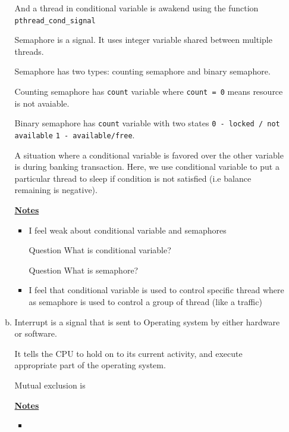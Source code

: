 \documentclass[12pt]{article}
\begin{document}
\begin{enumerate}[1.]
\begin{enumerate}[a)]
        \bigskip

        And a thread in conditional variable is awakend using the function \texttt{pthread\_cond\_signal}

        \bigskip

        Semaphore is a signal. It uses integer variable shared between multiple threads.

        \bigskip

        Semaphore has two types: counting semaphore and binary semaphore.

        \bigskip

        Counting semaphore has \texttt{count} variable where \texttt{count = 0} means
        resource is not avaiable.

        \bigskip

        Binary semaphore has \texttt{count} variable with two states \texttt{0 - locked / not available}
        \texttt{1 - available/free}.

        \bigskip

        A situation where a conditional variable is favored over the other variable
        is during banking transaction. Here, we use conditional variable to put a particular thread
        to sleep if condition is not satisfied (i.e balance remaining is negative).

        \bigskip

        \underline{\textbf{Notes}}

        \begin{itemize}
            \item I feel weak about conditional variable and semaphores
            \item [\color{blue}Question\color{black}] What is conditional variable?
            \item [\color{blue}Question\color{black}] What is semaphore?
            \item I feel that conditional variable is used to control specific thread
            where as semaphore is used to control a group of thread (like a traffic)
        \end{itemize}

        \item

        Interrupt is a signal that is sent to Operating system by either hardware or software.

        \bigskip

        It tells the CPU to hold on to its current activity, and execute appropriate part of the
        operating system.

        \bigskip

        Mutual exclusion is

        \bigskip

        \underline{\textbf{Notes}}

        \begin{itemize}
            \item
        \end{itemize}

    \end{enumerate}


\end{enumerate}
\end{document}
